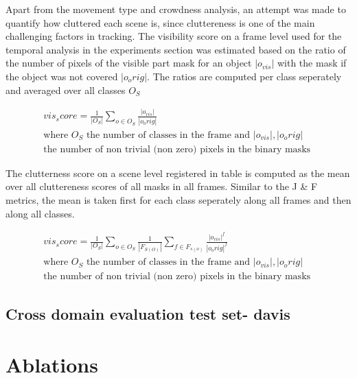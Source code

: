 Apart from the movement type and crowdness analysis, an attempt was made to quantify how cluttered each scene is, since cluttereness is one of the main challenging factors in tracking. The visibility score on a frame level used for the temporal analysis in the experiments section was estimated based on the ratio of the number of pixels of the visible part mask for an object $|o_{vis}|$ with the mask if the object was not covered $|o_orig|$. The ratios are computed per class seperately and averaged over all classes $O_S$ \par

\begin{gather}
        vis_score = \frac{1}{|O_S|}\sum_{o \in O_S} \frac{|o_{vis}|}{|o_orig|} \\
     \text{where } O_S \text{ the number of classes in the frame and } |o_{vis}|,|o_orig| \\ 
     \text{the number of non trivial (non zero) pixels in the binary masks }
\end{gather}

     
The clutterness score on a scene level registered in table 
is computed as the mean over all cluttereness scores of all masks in all frames. Similar to the J \& F metrics, the mean is taken first for each class seperately along all frames and then along all classes. \par


\begin{gather}
         vis_score = \frac{1}{|O_S|}\sum_{o \in O_S} \frac{1}{|F_{S(O)}|}\sum_{f \in F_{s(o)}}\frac{|o_{vis}|^f}{|o_orig|^f}
        \\
     \text{where } O_S \text{ the number of classes in the frame and } |o_{vis}|,|o_orig| \\ 
     \text{the number of non trivial (non zero) pixels in the binary masks }
\end{gather}



\subsection{Cross domain evaluation test set- davis}
\section{Ablations}
